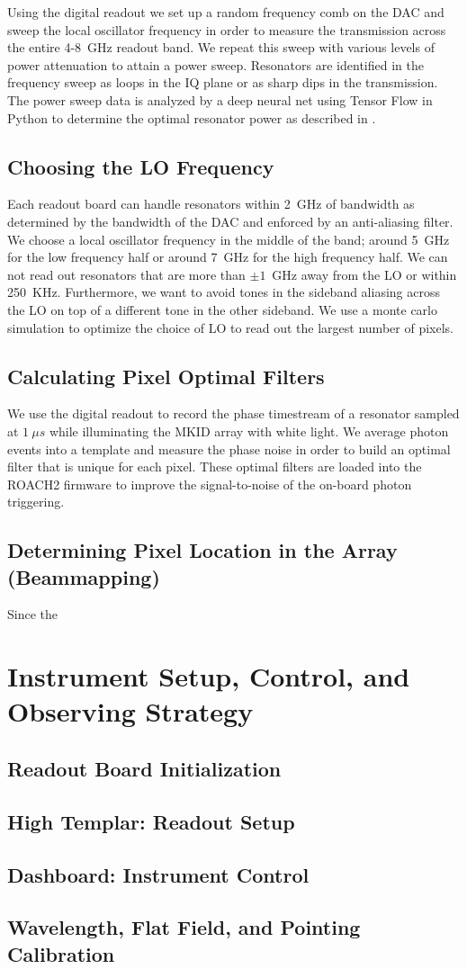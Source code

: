 \documentclass[../main.tex]{subfiles}
\begin{document}
Using the digital readout we set up a random frequency comb on the DAC and sweep the local oscillator frequency in order to measure the transmission across the entire 4-8~GHz readout band. We repeat this sweep with various levels of power attenuation to attain a power sweep. Resonators are identified in the frequency sweep as loops in the IQ plane or as sharp dips in the transmission. The power sweep data is analyzed by a deep neural net using Tensor Flow in Python to determine the optimal resonator power as described in \textcite{Dodkins_2018}. 

\subsection{Choosing the LO Frequency}
Each readout board can handle resonators within 2~GHz of bandwidth as determined by the bandwidth of the DAC and enforced by an anti-aliasing filter. We choose a local oscillator frequency in the middle of the band; around 5~GHz for the low frequency half or around 7~GHz for the high frequency half. We can not read out resonators that are more than $\pm1$~GHz away from the LO or within 250~KHz. Furthermore, we want to avoid tones in the sideband aliasing across the LO on top of a different tone in the other sideband. We use a monte carlo simulation to optimize the choice of LO to read out the largest number of pixels.

\subsection{Calculating Pixel Optimal Filters}
We use the digital readout to record the phase timestream of a resonator sampled at $1~\mu s$ while illuminating the MKID array with white light. We average photon events into a template and measure the phase noise in order to build an optimal filter that is unique for each pixel. These optimal filters are loaded into the ROACH2 firmware to improve the signal-to-noise of the on-board photon triggering. 

\subsection{Determining Pixel Location in the Array (Beammapping)}
Since the 


\section{Instrument Setup, Control, and Observing Strategy}

\subsection{Readout Board Initialization}
\subsection{High Templar: Readout Setup}
\subsection{Dashboard: Instrument Control}
\subsection{Wavelength, Flat Field, and Pointing Calibration}
\end{document}
